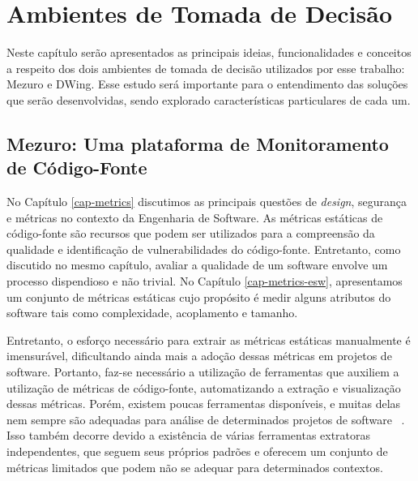 \chapter{Ambientes de Tomada de Decisão}
\label{cap-decision-making-environment}

%

Neste capítulo serão apresentados as principais ideias, funcionalidades e conceitos a respeito dos dois ambientes de tomada de decisão utilizados por esse trabalho: Mezuro e DWing. Esse estudo será importante para o entendimento das soluções que serão desenvolvidas, sendo explorado características particulares de cada um.

%

\section{Mezuro: Uma plataforma de Monitoramento de Código-Fonte}
\label{cap-mezuro}

No Capítulo \ref{cap-metrics} discutimos as principais questões de \emph{design}, segurança e métricas no contexto da Engenharia de Software. As métricas estáticas de código-fonte são recursos que podem ser utilizados para a compreensão da qualidade e identificação de vulnerabilidades do código-fonte. Entretanto, como discutido no mesmo capítulo, avaliar a qualidade de um software envolve um processo dispendioso e não trivial. No Capítulo \ref{cap-metrics-esw}, apresentamos um conjunto de métricas estáticas cujo propósito é medir alguns atributos do software tais como complexidade, acoplamento e tamanho. 

%

Entretanto, o esforço necessário para extrair as métricas estáticas manualmente é imensurável, dificultando ainda mais a adoção dessas métricas em projetos de software.
%
Portanto, faz-se necessário a utilização de ferramentas que auxiliem a utilização de métricas de código-fonte, automatizando a extração e visualização dessas métricas.
%
Porém, existem poucas ferramentas disponíveis, e muitas delas nem sempre são adequadas para análise de determinados projetos de software ~\cite{meirelles2010mezuro}.
%
Isso também decorre devido a existência de várias ferramentas extratoras independentes, que seguem seus próprios padrões e oferecem um conjunto de métricas limitados que podem não se adequar para determinados contextos.

%

